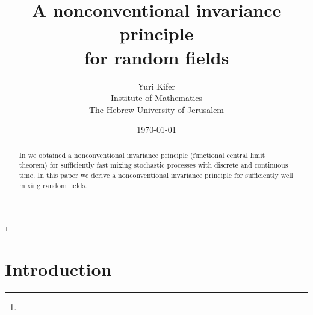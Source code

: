 
\usepackage{graphicx}
\usepackage{amssymb}
\usepackage{amsfonts}
\setlength{\footskip}{1cm}
\swapnumbers
\sloppy
{} 
\newtheorem{theorem}{Theorem}[section]
\newtheorem{lemma}[theorem]{Lemma}
\newtheorem{corollary}[theorem]{Corollary}
\newtheorem{proposition}[theorem]{Proposition}
\theoremstyle{definition}
\newtheorem{definition}[theorem]{Definition}
\newtheorem{assumption}[theorem]{Assumption}
\newtheorem{remark}[theorem]{Remark}
\newtheorem*{acknowledgment}{Acknowledgment}
\newtheorem*{remarks}{Remarks}
 \theoremstyle{plain}    
 \newtheorem{thm}{Theorem}[section]
 \theoremstyle{plain}    
 \newtheorem{cor}[thm]{Corollary} 
 \theoremstyle{plain}    
 \newtheorem{prop}[thm]{Proposition} 
 \theoremstyle{remark}    
 \newtheorem*{acknowledgement*}{Acknowledgement} 


\title[]{A nonconventional invariance principle\\
 for random fields} \vskip 0.1cm 
 \author{ Yuri Kifer\\
 \vskip 0.1cm
Institute of Mathematics\\
The Hebrew University of Jerusalem}
\address{Institute of Mathematics, Hebrew University, Jerusalem 91904,\linebreak
 Israel}
 
 

\thanks{ }
\dedicatory{  }
 \date{\today}
\begin{abstract}\noindent
In \cite{KV} we obtained a nonconventional invariance principle (functional 
central limit theorem) for sufficiently fast mixing stochastic processes with
discrete and continuous time. In this paper we derive a nonconventional 
invariance principle for sufficiently well mixing random fields. 
\end{abstract}
\maketitle
{} 


\section{Introduction}\label{sec1}\setcounter{equation}{0}

